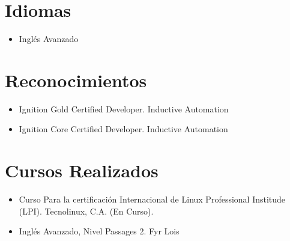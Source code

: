 \documentclass[letterpaper,12pt]{report}
\begin{document}
\section{Idiomas}
\begin{itemize}
    \item Inglés Avanzado
\end{itemize}

\section {Reconocimientos}
\begin{itemize}
    \item Ignition Gold Certified Developer. Inductive Automation
    \item Ignition Core Certified Developer. Inductive Automation
\end{itemize}

\section {Cursos Realizados}
\begin{itemize}
    \item Curso Para la certificación Internacional de Linux Professional Institude (LPI). Tecnolinux, C.A. (En Curso).
    \item Inglés Avanzado, Nivel Passages 2. Fyr Lois
\end{itemize}
\end{document}
